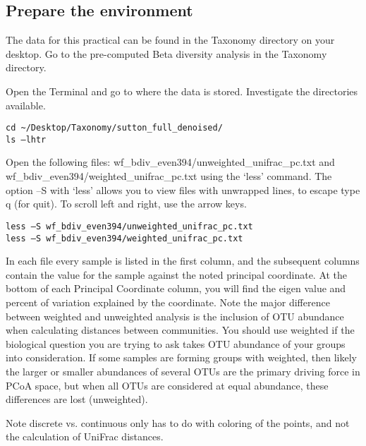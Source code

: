 \subsection{Prepare the environment}
The data for this practical can be found in the Taxonomy directory on your desktop. Go to the pre-computed Beta diversity analysis in the Taxonomy directory. 

\begin{steps}

Open the Terminal and go to where the data is stored. Investigate the directories available.

\begin{lstlisting}
cd ~/Desktop/Taxonomy/sutton_full_denoised/
ls –lhtr
\end{lstlisting}
\end{steps}

\begin{steps}
Open the following files:
wf_bdiv_even394/unweighted_unifrac_pc.txt and wf_bdiv_even394/weighted_unifrac_pc.txt 
using the ‘less’ command. The option –S with ‘less’ allows you to view files with unwrapped lines, to escape type q (for quit). To scroll left and right, use the arrow keys.
\begin{lstlisting}
less –S wf_bdiv_even394/unweighted_unifrac_pc.txt
less –S wf_bdiv_even394/weighted_unifrac_pc.txt
\end{lstlisting}
\end{steps}

In each file every sample is listed in the first column, and the subsequent columns contain the value for the sample against the noted principal coordinate. At the bottom of each Principal Coordinate column, you will find the eigen value and percent of variation explained by the coordinate. 
Note the major difference between weighted and unweighted analysis is the inclusion of OTU abundance when calculating distances between communities. You should use weighted if the biological question you are trying to ask takes OTU abundance of your groups into consideration. If some samples are forming groups with weighted, then likely the larger or smaller abundances of several OTUs are the primary driving force in PCoA space, but when all OTUs are considered at equal abundance, these differences are lost (unweighted).

Note discrete vs. continuous only has to do with coloring of the points, and not the calculation of UniFrac distances.



